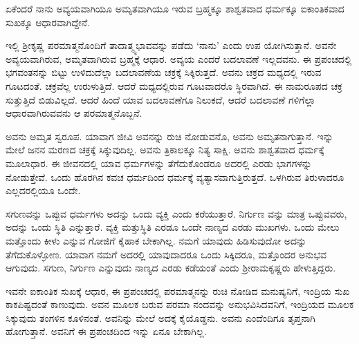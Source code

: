 {\small ಏಕೆಂದರೆ ನಾನು ಅವ್ಯಯವಾಗಿಯೂ ಅಮೃತವಾಗಿಯೂ ಇರುವ ಬ್ರಹ್ಮಕ್ಕೂ ಶಾಶ್ವತವಾದ ಧರ್ಮಕ್ಕೂ ಐಕಾಂತಿಕವಾದ ಸುಖಕ್ಕೂ ಆಧಾರವಾಗಿದ್ದೇನೆ.}

ಇಲ್ಲಿ ಶ್ರೀಕೃಷ್ಣ ಪರಮಾತ್ಮನೊಂದಿಗೆ ತಾದಾತ್ಮ್ಯಭಾವವನ್ನು ಪಡೆದು ‘ನಾನು’ ಎಂದು ಉಪ ಯೋಗಿಸುತ್ತಾನೆ. ಅವನೇ ಅವ್ಯಯವಾಗಿರುವ, ಅಮೃತವಾಗಿರುವ ಬ್ರಹ್ಮಕ್ಕೆ ಆಧಾರ. ಅವ್ಯಯ ಎಂದರೆ ಬದಲಾವಣೆ ಇಲ್ಲದವನು. ಈ ಪ್ರಪಂಚದಲ್ಲಿ ಭಗವಂತನನ್ನು ಬಿಟ್ಟು ಉಳಿದುದೆಲ್ಲಾ ಬದಲಾವಣೆಯ ಚಕ್ರಕ್ಕೆ ಸಿಕ್ಕಿರುತ್ತದೆ. ಅವನು ಚಕ್ರದ ಮಧ್ಯದಲ್ಲಿ ಇರುವ ಗೂಟದಂತೆ. ಚಕ್ರವೆಲ್ಲ ಉರುಳುತ್ತಿದೆ. ಆದರೆ ಮಧ್ಯದಲ್ಲಿರುವ ಗೂಟವಾದರೊ ಸ್ಥಿರವಾಗಿದೆ. ಈ ನಾಮರೂಪದ ಚಕ್ರ ಸುತ್ತುತ್ತಿದೆ ಬಿಡುವಿಲ್ಲದೆ. ಆದರೆ ಹಿಂದೆ ಯಾವ ಬದಲಾವಣೆಗೂ ನಿಲುಕದೆ, ಆದರೆ ಬದಲಾವಣೆ ಗಳಿಗೆಲ್ಲಾ ಆಧಾರವಾಗಿರುವವನು ಆ ಪರಮಾತ್ಮನೊಬ್ಬನೆ.

ಅವನು ಅಮೃತ ಸ್ವರೂಪ. ಯಾವಾಗ ಜೀವಿ ಅವನನ್ನು ರುಚಿ ನೋಡುವನೊ, ಅವನು ಅಮೃತನಾಗುತ್ತಾನೆ. ಇನ್ನು ಮೇಲೆ ಜನನ ಮರಣದ ಚಕ್ರಕ್ಕೆ ಸಿಕ್ಕುವುದಿಲ್ಲ. ಅವನು ತ್ರಿಕಾಲಕ್ಕೂ ನಿತ್ಯ ಸಾಕ್ಷಿ. ಅವನು ಶಾಶ್ವತವಾದ ಧರ್ಮಕ್ಕೆ ಮೂಲಾಧಾರ. ಈ ಜೀವನದಲ್ಲಿ ಯಾವ ಧರ್ಮಗಳನ್ನು ತೆಗೆದುಕೊಂಡರೂ ಅದರಲ್ಲಿ ಎರಡು ಭಾಗಗಳನ್ನು ನೋಡುತ್ತೇವೆ. ಒಂದು ಹೊರಗಿನ ಕವಚ ಧರ್ಮದಿಂದ ಧರ್ಮಕ್ಕೆ ವ್ಯತ್ಯಾಸವಾಗುತ್ತಿರುತ್ತದೆ. ಒಳಗಿರುವ ತಿರುಳಾದರೂ ಎಲ್ಲದರಲ್ಲಿಯೂ ಒಂದೇ.

ಸಗುಣವನ್ನು ಒಪ್ಪುವ ಧರ್ಮಗಳು ಅದನ್ನು ಒಂದು ವ್ಯಕ್ತಿ ಎಂದು ಕರೆಯುತ್ತಾರೆ. ನಿರ್ಗುಣ ವನ್ನು ಮಾತ್ರ ಒಪ್ಪುವವರು, ಅದನ್ನು ಒಂದು ಸ್ಥಿತಿ ಎನ್ನುತ್ತಾರೆ. ವ್ಯಕ್ತಿ ಮತ್ತುಸ್ಥಿತಿ ಎರಡೂ ಒಂದೇ ನಾಣ್ಯದ ಎರಡು ಮುಖಗಳು. ಒಂದು ಮೇಲು ಮತ್ತೊಂದು ಕೀಳು ಎನ್ನುವ ಗೋಜಿಗೆ ಕೈಹಾಕ ಬೇಕಾಗಿಲ್ಲ. ನಮಗೆ ಯಾವುದು ಹಿಡಿಸುವುದೋ ಅದನ್ನು ತೆಗೆದುಕೊಳ್ಳೋಣ. ಯಾವಾಗ ನಮಗೆ ಅದರಲ್ಲಿ ಯಾವುದಾದರೂ ಒಂದು ಸಿಕ್ಕಿದರೂ, ಮತ್ತೊಂದರ ಅನುಭವ ಆಗುವುದು. ಸಗುಣ, ನಿರ್ಗುಣ ಎನ್ನುವುದು ನಾಣ್ಯದ ಎರಡು ಕಡೆಯಂತೆ ಎಂದು ಶ್ರೀರಾಮಕೃಷ್ಣರು ಹೇಳುತ್ತಿದ್ದರು.

ಇವನೇ ಐಕಾಂತಿಕ ಸುಖಕ್ಕೆ ಆಧಾರ, ಈ ಪ್ರಪಂಚದಲ್ಲಿ ಪರಮಾತ್ಮನನ್ನು ರುಚಿ ನೋಡಿದ ಮನುಷ್ಯನಿಗೆ, ಇಂದ್ರಿಯ ಸುಖ ಕಾಕಪಿಷ್ಟದಂತೆ ಕಾಣುವುದು. ಅವನ ಮೂಲಕ ಬರುವ ಪರಮಾ ನಂದವನ್ನು ಅನುಭವಿಸಿದವನಿಗೆ, ಇಂದ್ರಿಯದ ಮೂಲಕ ಸಿಕ್ಕುವುದು ತಂಗಳಿನ ಕೂಳಿನಂತೆ. ಅವನಿನ್ನು ಮೇಲೆ ಅದಕ್ಕೆ ಕೈಯೊಡ್ಡನು. ಅವನು ಎಂದೆಂದಿಗೂ ತೃಪ್ತನಾಗಿ ಹೋಗುತ್ತಾನೆ. ಅವನಿಗೆ ಈ ಪ್ರಪಂಚದಿಂದ ಇನ್ನು ಏನೂ ಬೇಕಾಗಿಲ್ಲ.

